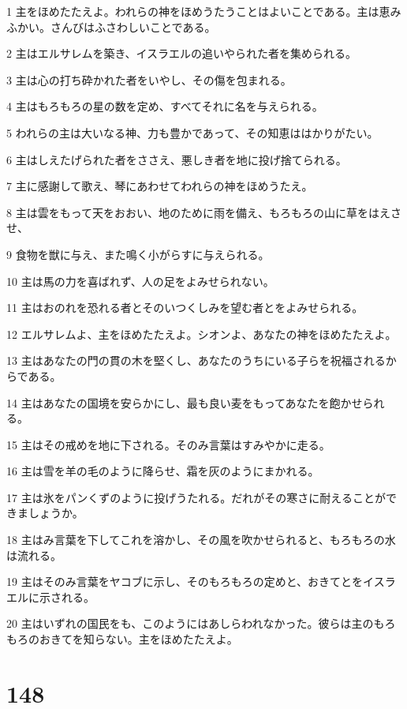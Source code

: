 \par 1 主をほめたたえよ。われらの神をほめうたうことはよいことである。主は恵みふかい。さんびはふさわしいことである。
\par 2 主はエルサレムを築き、イスラエルの追いやられた者を集められる。
\par 3 主は心の打ち砕かれた者をいやし、その傷を包まれる。
\par 4 主はもろもろの星の数を定め、すべてそれに名を与えられる。
\par 5 われらの主は大いなる神、力も豊かであって、その知恵ははかりがたい。
\par 6 主はしえたげられた者をささえ、悪しき者を地に投げ捨てられる。
\par 7 主に感謝して歌え、琴にあわせてわれらの神をほめうたえ。
\par 8 主は雲をもって天をおおい、地のために雨を備え、もろもろの山に草をはえさせ、
\par 9 食物を獣に与え、また鳴く小がらすに与えられる。
\par 10 主は馬の力を喜ばれず、人の足をよみせられない。
\par 11 主はおのれを恐れる者とそのいつくしみを望む者とをよみせられる。
\par 12 エルサレムよ、主をほめたたえよ。シオンよ、あなたの神をほめたたえよ。
\par 13 主はあなたの門の貫の木を堅くし、あなたのうちにいる子らを祝福されるからである。
\par 14 主はあなたの国境を安らかにし、最も良い麦をもってあなたを飽かせられる。
\par 15 主はその戒めを地に下される。そのみ言葉はすみやかに走る。
\par 16 主は雪を羊の毛のように降らせ、霜を灰のようにまかれる。
\par 17 主は氷をパンくずのように投げうたれる。だれがその寒さに耐えることができましょうか。
\par 18 主はみ言葉を下してこれを溶かし、その風を吹かせられると、もろもろの水は流れる。
\par 19 主はそのみ言葉をヤコブに示し、そのもろもろの定めと、おきてとをイスラエルに示される。
\par 20 主はいずれの国民をも、このようにはあしらわれなかった。彼らは主のもろもろのおきてを知らない。主をほめたたえよ。

\chapter{148}

